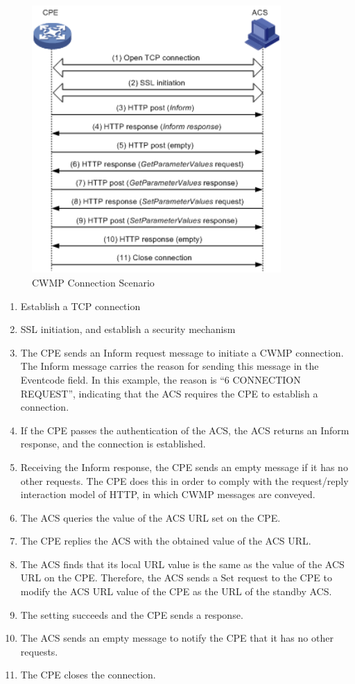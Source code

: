 \begin{figure}[htbp]
	\centering
		\includegraphics[width=9.5cm]{Figures/connection_request.png}
	\caption[CWMP Connection Scenario]{CWMP Connection Scenario}
	\label{fig:connectionrequest}
\end{figure}

\begin{enumerate}
  \item Establish a TCP connection
  \item SSL initiation, and establish a security mechanism
  \item The CPE sends an Inform request message to initiate a CWMP connection. The Inform message carries the reason for sending this message in the Eventcode field. In this example, the reason is ``6 CONNECTION REQUEST'', indicating that the ACS requires the CPE to establish a connection.
  \item If the CPE passes the authentication of the ACS, the ACS returns an Inform response, and the connection is established.
  \item Receiving the Inform response, the CPE sends an empty message if it has no other requests. The CPE does this in order to comply with the request/reply interaction model of HTTP, in which CWMP messages are conveyed.
  \item The ACS queries the value of the ACS URL set on the CPE.
  \item The CPE replies the ACS with the obtained value of the ACS URL.
  \item The ACS finds that its local URL value is the same as the value of the ACS URL on the CPE. Therefore, the ACS sends a Set request to the CPE to modify the ACS URL value of the CPE as the URL of the standby ACS.
  \item The setting succeeds and the CPE sends a response.
  \item The ACS sends an empty message to notify the CPE that it has no other requests.
  \item The CPE closes the connection.
\end{enumerate}

